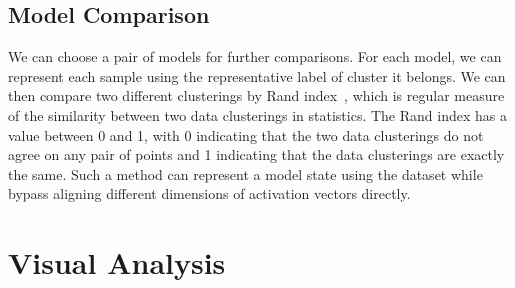 \documentclass[11pt, twocolumn]{article}
\begin{document}
\subsection{Model Comparison}
We can choose a pair of models for further comparisons. For each model, we can represent each sample using the representative label of cluster it belongs.
We can then compare two different clusterings by Rand index~\cite{Hubert1985}, which is regular measure of the similarity between two data clusterings in statistics. The Rand index has a value between 0 and 1, with 0 indicating that the two data clusterings do not agree on any pair of points and 1 indicating that the data clusterings are exactly the same. Such a method can represent a model state using the dataset while bypass aligning different dimensions of activation vectors directly.



\section{Visual Analysis}
\end{document}
